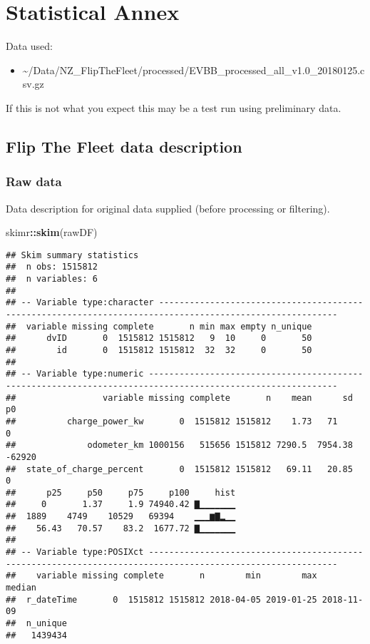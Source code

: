\documentclass[]{article}
\newenvironment{Shaded}{\begin{snugshade}}{\end{snugshade}}
\newcommand{\KeywordTok}[1]{\textcolor[rgb]{0.13,0.29,0.53}{\textbf{#1}}}
\newcommand{\NormalTok}[1]{#1}
\newcommand{\OperatorTok}[1]{\textcolor[rgb]{0.81,0.36,0.00}{\textbf{#1}}}
\providecommand{\tightlist}{%
  \setlength{\itemsep}{0pt}\setlength{\parskip}{0pt}}
\begin{document}
\hypertarget{statistical-annex}{%
\section{Statistical Annex}\label{statistical-annex}}

Data used:

\begin{itemize}
\tightlist
\item
  \textasciitilde{}/Data/NZ\_FlipTheFleet/processed/EVBB\_processed\_all\_v1.0\_20180125.csv.gz
\end{itemize}

If this is not what you expect this may be a test run using preliminary data.

\hypertarget{flip-the-fleet-data-description}{%
\subsection{Flip The Fleet data description}\label{flip-the-fleet-data-description}}

\hypertarget{raw-data}{%
\subsubsection{Raw data}\label{raw-data}}

Data description for original data supplied (before processing or filtering).

\begin{Shaded}
\begin{Highlighting}[]
\NormalTok{skimr}\OperatorTok{::}\KeywordTok{skim}\NormalTok{(rawDF)}
\end{Highlighting}
\end{Shaded}

\begin{verbatim}
## Skim summary statistics
##  n obs: 1515812 
##  n variables: 6 
## 
## -- Variable type:character ---------------------------------------------------------------------------------------------------------
##  variable missing complete       n min max empty n_unique
##      dvID       0  1515812 1515812   9  10     0       50
##        id       0  1515812 1515812  32  32     0       50
## 
## -- Variable type:numeric -----------------------------------------------------------------------------------------------------------
##                 variable missing complete       n    mean      sd     p0
##          charge_power_kw       0  1515812 1515812    1.73   71         0
##              odometer_km 1000156   515656 1515812 7290.5  7954.38 -62920
##  state_of_charge_percent       0  1515812 1515812   69.11   20.85      0
##      p25     p50     p75     p100     hist
##     0       1.37     1.9 74940.42 ▇▁▁▁▁▁▁▁
##  1889    4749    10529   69394    ▁▁▁▆▇▂▁▁
##    56.43   70.57    83.2  1677.72 ▇▁▁▁▁▁▁▁
## 
## -- Variable type:POSIXct -----------------------------------------------------------------------------------------------------------
##    variable missing complete       n        min        max     median
##  r_dateTime       0  1515812 1515812 2018-04-05 2019-01-25 2018-11-09
##  n_unique
##   1439434
\end{verbatim}
\end{document}
